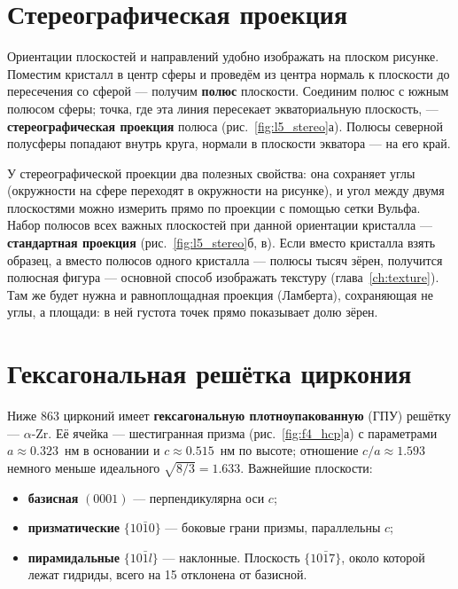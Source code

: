 \section{Стереографическая проекция}

Ориентации плоскостей и направлений удобно изображать на плоском рисунке. Поместим кристалл в центр сферы и
проведём из центра нормаль к плоскости до пересечения со сферой --- получим \textbf{полюс} плоскости. Соединим
полюс с южным полюсом сферы; точка, где эта линия пересекает экваториальную плоскость, --- \textbf{стереографическая
проекция} полюса (рис.~\ref{fig:l5_stereo}а). Полюсы северной полусферы попадают внутрь круга, нормали в плоскости
экватора --- на его край.


У стереографической проекции два полезных свойства: она сохраняет углы (окружности на сфере переходят в
окружности на рисунке), и угол между двумя плоскостями можно измерить прямо по проекции с помощью сетки Вульфа.
Набор полюсов всех важных плоскостей при данной ориентации кристалла --- \textbf{стандартная проекция}
(рис.~\ref{fig:l5_stereo}б, в). Если вместо кристалла взять образец, а вместо полюсов одного кристалла ---
полюсы тысяч зёрен, получится полюсная фигура --- основной способ изображать текстуру (глава~\ref{ch:texture}).
Там же будет нужна и равноплощадная проекция (Ламберта), сохраняющая не углы, а площади: в ней густота точек
прямо показывает долю зёрен.

\section{Гексагональная решётка циркония}

Ниже 863\degC{} цирконий имеет \textbf{гексагональную плотноупакованную} (ГПУ) решётку --- $\alpha$-Zr.
Её ячейка --- шестигранная призма (рис.~\ref{fig:f4_hcp}а) с параметрами $a \approx 0.323$~нм в основании и
$c\approx 0.515$~нм по высоте; отношение $c/a\approx1.593$ немного меньше идеального $\sqrt{8/3}=1.633$.
Важнейшие плоскости:
\begin{itemize}
\item \textbf{базисная} $(0001)$ --- перпендикулярна оси $c$;
\item \textbf{призматические} $\{10\bar10\}$ --- боковые грани призмы, параллельны $c$;
\item \textbf{пирамидальные} $\{10\bar1l\}$ --- наклонные. Плоскость $\{10\bar17\}$, около которой лежат
  гидриды, всего на 15\textdegree{} отклонена от базисной.
\end{itemize}

